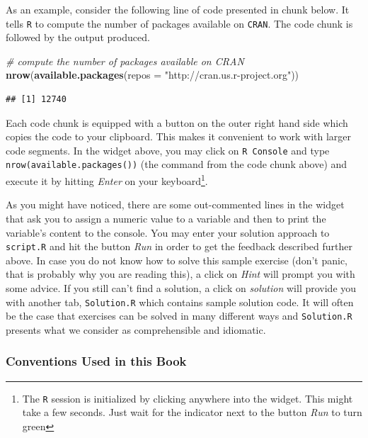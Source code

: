 \documentclass[]{book}
\newenvironment{Shaded}{\begin{snugshade}}{\end{snugshade}}
\newcommand{\KeywordTok}[1]{\textcolor[rgb]{0.13,0.29,0.53}{\textbf{#1}}}
\newcommand{\DataTypeTok}[1]{\textcolor[rgb]{0.13,0.29,0.53}{#1}}
\newcommand{\StringTok}[1]{\textcolor[rgb]{0.31,0.60,0.02}{#1}}
\newcommand{\CommentTok}[1]{\textcolor[rgb]{0.56,0.35,0.01}{\textit{#1}}}
\newcommand{\NormalTok}[1]{#1}
\let\rmarkdownfootnote\footnote%
\def\footnote{\protect\rmarkdownfootnote}
\theoremstyle{definition}
\theoremstyle{definition}
\theoremstyle{definition}
\theoremstyle{remark}
\begin{document}
As an example, consider the following line of code presented in chunk
below. It tells \texttt{R} to compute the number of packages available
on \texttt{CRAN}. The code chunk is followed by the output produced.

\begin{Shaded}
\begin{Highlighting}[]
\CommentTok{# compute the number of packages available on CRAN}
\KeywordTok{nrow}\NormalTok{(}\KeywordTok{available.packages}\NormalTok{(}\DataTypeTok{repos =} \StringTok{"http://cran.us.r-project.org"}\NormalTok{))}
\end{Highlighting}
\end{Shaded}

\begin{verbatim}
## [1] 12740
\end{verbatim}

Each code chunk is equipped with a button on the outer right hand side
which copies the code to your clipboard. This makes it convenient to
work with larger code segments. In the widget above, you may click on
\texttt{R Console} and type \texttt{nrow(available.packages())} (the
command from the code chunk above) and execute it by hitting
\emph{Enter} on your keyboard\footnote{The \texttt{R} session is
  initialized by clicking anywhere into the widget. This might take a
  few seconds. Just wait for the indicator next to the button \emph{Run}
  to turn green}.

As you might have noticed, there are some out-commented lines in the
widget that ask you to assign a numeric value to a variable and then to
print the variable's content to the console. You may enter your solution
approach to \texttt{script.R} and hit the button \emph{Run} in order to
get the feedback described further above. In case you do not know how to
solve this sample exercise (don't panic, that is probably why you are
reading this), a click on \emph{Hint} will prompt you with some advice.
If you still can't find a solution, a click on \emph{solution} will
provide you with another tab, \texttt{Solution.R} which contains sample
solution code. It will often be the case that exercises can be solved in
many different ways and \texttt{Solution.R} presents what we consider as
comprehensible and idiomatic.

\subsubsection*{Conventions Used in this
Book}\label{conventions-used-in-this-book}
\end{document}
